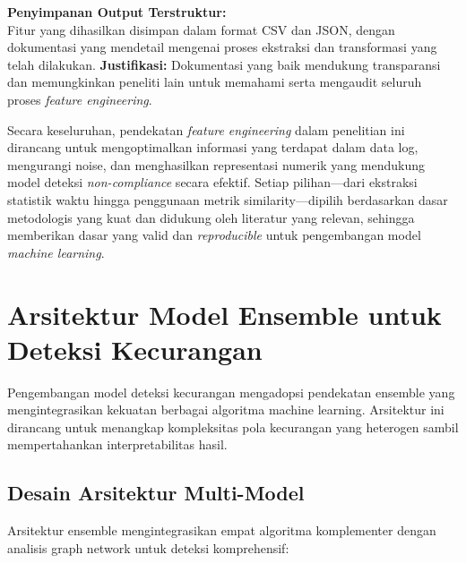 \textbf{Penyimpanan Output Terstruktur:} \\
Fitur yang dihasilkan disimpan dalam format CSV dan JSON, dengan dokumentasi yang mendetail mengenai proses ekstraksi dan transformasi yang telah dilakukan.
\textbf{Justifikasi:} Dokumentasi yang baik mendukung transparansi dan memungkinkan peneliti lain untuk memahami serta mengaudit seluruh proses \textit{feature engineering}.

Secara keseluruhan, pendekatan \textit{feature engineering} dalam penelitian ini dirancang untuk mengoptimalkan informasi yang terdapat dalam data log, mengurangi noise, dan menghasilkan representasi numerik yang mendukung model deteksi \textit{non-compliance} secara efektif. Setiap pilihan---dari ekstraksi statistik waktu hingga penggunaan metrik similarity---dipilih berdasarkan dasar metodologis yang kuat dan didukung oleh literatur yang relevan, sehingga memberikan dasar yang valid dan \textit{reproducible} untuk pengembangan model \textit{machine learning}.


\section{Arsitektur Model Ensemble untuk Deteksi Kecurangan}
\label{sec:arsitekturModelEnsemble}

Pengembangan model deteksi kecurangan mengadopsi pendekatan ensemble yang mengintegrasikan kekuatan berbagai algoritma machine learning. Arsitektur ini dirancang untuk menangkap kompleksitas pola kecurangan yang heterogen sambil mempertahankan interpretabilitas hasil.

\subsection{Desain Arsitektur Multi-Model}
\label{subsec:desainArsitektur}

Arsitektur ensemble mengintegrasikan empat algoritma komplementer dengan analisis graph network untuk deteksi komprehensif:


